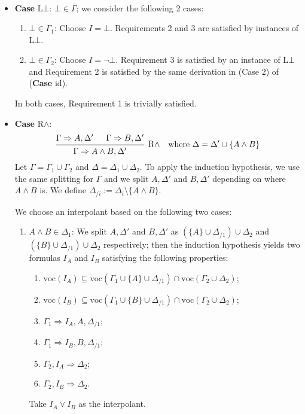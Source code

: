 \documentclass[a4paper]{article}
\newcommand{\voc}{\mathrm{voc}}
\newcommand{\id}{\mathrm{id}}
\begin{document}
\begin{itemize}
\begin{enumerate}
\begin{align*}
    \end{align*}
  \end{enumerate}
\item \textbf{Case} L$\bot$: $\bot \in \Gamma$; we consider the following 2 cases:
  \begin{enumerate}
  \item $\bot \in \Gamma_1$: Choose $I = \bot$.
    Requirements 2 and 3 are satisfied by instances of L$\bot$.
  \item $\bot \in \Gamma_2$: Choose $I = \lnot\bot$.
    Requirement 3 is satisfied by an instance of L$\bot$ and Requirement 2 is satisfied by the same derivation in (Case 2) of (\textbf{Case} $\id$).
  \end{enumerate}
  In both cases, Requirement 1 is trivially satisfied.
\item \textbf{Case} R$\wedge$:
  \begin{align*}
    \begin{prooftree}
      \hypo{\Gamma \Rightarrow A, \Delta'}
      \hypo{\Gamma \Rightarrow B, \Delta'}
      \infer2[R$\wedge$]{\Gamma \Rightarrow A \wedge B, \Delta'}
    \end{prooftree}
    && \text{where $\Delta = \Delta' \cup \{A \wedge B\}$}
  \end{align*}
  Let $\Gamma = \Gamma_1 \cup \Gamma_2$ and $\Delta = \Delta_1 \cup \Delta_2$.
  To apply the induction hypothesis, we use the same splitting for $\Gamma$ and we split $A,\Delta'$ and $B,\Delta'$ depending on where $A \wedge B$ is.
  We define $\Delta_{/i} := \Delta_{i} \setminus \{A \wedge B\}$.

  We choose an interpolant based on the following two cases:
  \begin{enumerate}
  \item $A \wedge B \in \Delta_1$:
    We split $A,\Delta'$ and $B,\Delta'$ as $(\{A\} \cup \Delta_{/1}) \cup \Delta_2$ and $(\{B\} \cup \Delta_{/1}) \cup \Delta_2$ respectively; then the induction hypothesis yields two formulas $I_A$ and $I_B$ satisfying the following properties:
    \begin{enumerate}
    \item $\voc(I_A) \subseteq \voc(\Gamma_1 \cup \{A\} \cup \Delta_{/1}) \cap \voc(\Gamma_2 \cup \Delta_2)$;
    \item $\voc(I_B) \subseteq \voc(\Gamma_1 \cup \{B\} \cup \Delta_{/1}) \cap \voc(\Gamma_2 \cup \Delta_2)$;
    \item $\Gamma_1 \Rightarrow I_A,A,\Delta_{/1}$;
    \item $\Gamma_1 \Rightarrow I_B,B,\Delta_{/1}$;
    \item $\Gamma_2,I_A \Rightarrow \Delta_2$;
    \item $\Gamma_2,I_B \Rightarrow \Delta_2$.
    \end{enumerate}
    Take $I_A \vee I_B$ as the interpolant.
    

\end{enumerate}
\end{itemize}
\end{document}
